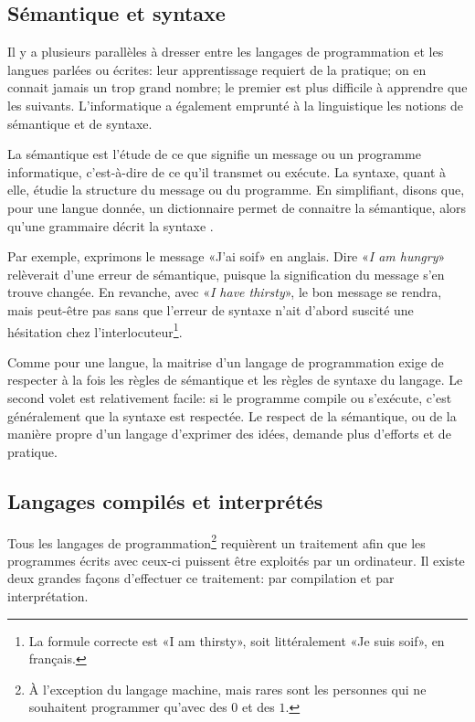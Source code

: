 \subsection{Sémantique et syntaxe}
\label{sec:informatique:concepts:semantique}

Il y a plusieurs parallèles à dresser entre les langages de
programmation et les langues parlées ou écrites: leur apprentissage
requiert de la pratique; on en connait jamais un trop grand nombre; le
premier est plus difficile à apprendre que les suivants.
L'informatique a également emprunté à la linguistique les notions de
sémantique et de syntaxe.

La sémantique est l'étude de ce que signifie un message ou un
programme informatique, c'est-à-dire de ce qu'il transmet ou exécute.
La syntaxe, quant à elle, étudie la structure du message ou du
programme. En simplifiant, disons que, pour une langue donnée, un
dictionnaire permet de connaitre la sémantique, alors qu'une grammaire
décrit la syntaxe \citep{Hebenstreit:semantique}.

Par exemple, exprimons le message «J'ai soif» en anglais. Dire
«\emph{I am hungry}» relèverait d'une erreur de sémantique, puisque la
signification du message s'en trouve changée. En revanche, avec
«\emph{I have thirsty}», le bon message se rendra, mais peut-être pas
sans que l'erreur de syntaxe n'ait d'abord suscité une hésitation chez
l'interlocuteur\footnote{%
  La formule correcte est «I am thirsty», soit littéralement «Je suis
  soif», en français.}.

Comme pour une langue, la maitrise d'un langage de programmation exige
de respecter à la fois les règles de sémantique et les règles de
syntaxe du langage. Le second volet est relativement facile: si le
programme compile ou s'exécute, c'est généralement que la syntaxe est
respectée. Le respect de la sémantique, ou de la manière propre d'un
langage d'exprimer des idées, demande plus d'efforts et de pratique.


\subsection{Langages compilés et interprétés}
\label{sec:informatique:concepts:compile_vs_interprete}

Tous les langages de programmation\footnote{%
  À l'exception du langage machine, mais rares sont les personnes qui
  ne souhaitent programmer qu'avec des $0$ et des $1$.} %
requièrent un traitement afin que les programmes écrits avec ceux-ci
puissent être exploités par un ordinateur. Il existe deux grandes
façons d'effectuer ce traitement: par compilation et par
interprétation.

